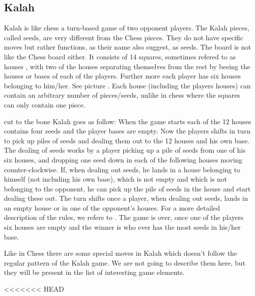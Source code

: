 \subsection{Kalah}

Kalah is like chess a turn-based game of two opponent players. The Kalah pieces, called seeds, are very different from the Chess pieces. They do not have specific moves but rather functions, as their name also suggest, as seeds. The board is not like the Chess board either. It consists of 14 squares, sometimes refered to as houses \cite{kalahrules}, with two of the houses separating themselves from the rest by beeing the houses or bases of each of the players. Further more each player has six houses belonging to him/her. See picture . Each house (including the players houses) can contain an arbitrary number of pieces/seeds, unlike in chess where the squares can only contain one piece.  

cut to the bone Kalah goes as follow: When the game starts each of the 12 houses contains four seeds and the player bases are empty. Now the players shifts in turn to pick up piles of seeds and dealing them out to the 12 houses and his own base. The dealing of seeds works by a player picking up a pile of seeds from one of his six houses, and dropping one seed down in each of the following houses moving counter-clockwise. If, when dealing out seeds, he lands in a house belonging to himself (not including his own base), which is not empty and which is not belonging to the opponent, he can pick up the pile of seeds in the house and start dealing these out. The turn shifts once a player, when dealing out seeds, lands in an empty house or in one of the opponent's houses. For a more detailed description of the rules, we refere to \cite{kalahrules}. The game is over, once one of the players six houses are empty and the winner is who ever has the most seeds in his/her base.

Like in Chess there are some special moves in Kalah which doesn't follow the regular pattern of the Kalah game. We are not going to describe them here, but they will be present in the list of interesting game elements.   

<<<<<<< HEAD

